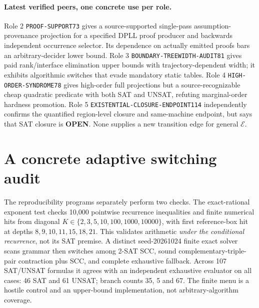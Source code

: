 \documentclass[11pt]{article}
\newcommand{\E}{\mathcal E}
\newcommand{\OPEN}{\textbf{OPEN}}
\begin{document}
\paragraph{Latest verified peers, one concrete use per role.}
Role 2 \texttt{PROOF-SUPPORT73} gives a source-supported single-pass assumption-provenance projection for a specified DPLL proof producer and backwards independent occurrence selector. Its dependence on actually emitted proofs bars an arbitrary-decider lower bound. Role 3 \texttt{BOUNDARY-TREEWIDTH-AUDIT81} gives paid rank/interface elimination upper bounds with trajectory-dependent width; it exhibits algorithmic switches that evade mandatory static tables. Role 4 \texttt{HIGH-ORDER-SYNDROME78} gives high-order full projections but a source-recognizable cheap quadratic predicate with both SAT and UNSAT, refuting marginal-order hardness promotion. Role 5 \texttt{EXISTENTIAL-CLOSURE-ENDPOINT114} independently confirms the quantified region-level closure and same-machine endpoint, but says that SAT closure is \OPEN. None supplies a new transition edge for general $\E$.

\section{A concrete adaptive switching audit}
The reproducibility programs separately perform two checks. The exact-rational exponent test checks 10,000 pointwise recurrence inequalities and finite numerical hits from diagonal $K\in\{2,3,5,10,100,1000,10000\}$, with first reference-box hit at depths $8,9,10,11,15,18,21$. This validates arithmetic \emph{under the conditional recurrence}, not its SAT premise. A distinct seed-20261024 finite exact solver scans grammar then switches among 2-SAT SCC, sound complementary-triple-pair contraction plus SCC, and complete exhaustive fallback. Across 107 SAT/UNSAT formulas it agrees with an independent exhaustive evaluator on all cases: 46 SAT and 61 UNSAT; branch counts 35, 5 and 67. The finite menu is a hostile control and an upper-bound implementation, not arbitrary-algorithm coverage.
\end{document}
